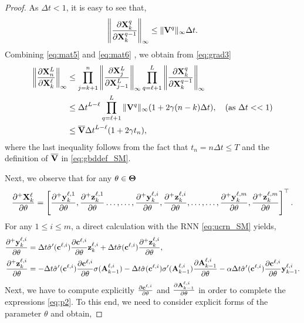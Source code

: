 \documentclass{article}
\newcommand{\by}{{\bf y}}
\newcommand{\bz}{{\bf z}}
\newcommand{\bV}{{\bf V}}
\newcommand{\bA}{{\bf A}}
\newcommand{\bX}{{\bf X}}
\newcommand{\bc}{{\bf c}}
\newcommand{\Dt}{{\Delta t}}
\begin{document}
\begin{proof}
As $\Dt <1$, it is easy to see that,
\begin{equation}
    \label{eq:mat6}
   \left \|\frac{\partial \bX^q_k}{\partial \bX^{q-1}_{k}}  \right \|_{\infty} \leq  \|\bV^q\|_{\infty} \Dt.
\end{equation}
Combining \eqref{eq:mat5} and \eqref{eq:mat6} , we obtain from \eqref{eq:grad3}
\begin{equation}
    \label{eq:mat7}
    \begin{aligned}
    \left \|\frac{\partial \bX^L_n}{\partial \bX^\ell_{k}}  \right \|_{\infty} &\leq \prod\limits_{j=k+1}^n  \left\|\frac{\partial \bX^L_j}{\partial \bX^L_{j-1}}\right \|_{\infty} \prod\limits_{q=\ell+1}^L  \left\|\frac{\partial \bX^q_k}{\partial \bX^{q-1}_{k}}\right\|_{\infty} \\ 
    &\leq \Dt^{L-\ell}\prod\limits_{q=\ell+1}^L \|\bV^q\|_{\infty} (1+2\gamma(n-k)\Dt), \quad ({\rm as}~\Dt <<1) \\
    &\leq \overline{\bV} \Dt^{L-\ell} (1+2\gamma t_n),
    \end{aligned}
\end{equation}
where the last inequality follows from the fact that $t_n = n \Dt \leq T$ and the definition of $\overline{\bV}$ in \eqref{eq:gbddef_SM}.

Next, we observe that for any $\theta \in {\bf \Theta}$
\begin{equation}
    \label{eq:p1}
    \frac{\partial^+\bX^\ell_k}{\partial \theta} = \left[
\frac{\partial^+\by^{\ell,1}_k}{\partial \theta},\frac{\partial^+\bz^{\ell,1}_k}{\partial \theta}\ldots,
\ldots,\frac{\partial^+\by^{\ell,i}_k}{\partial \theta},\frac{\partial^+\bz^{\ell,i}_k}{\partial \theta},\ldots,\ldots,\frac{\partial^+\by^{\ell,m}_k}{\partial \theta},\frac{\partial^+\bz^{\ell,m}_k}{\partial \theta}\right]^\top.
\end{equation}
For any $1 \leq i \leq m$, a direct calculation with the RNN \eqref{eq:ucrn_SM} yields,
\begin{equation}
    \label{eq:p2}
    \begin{aligned}
    \frac{\partial^+\by^{\ell,i}_k}{\partial \theta}&= \Dt \hat{\sigma}^{\prime}(\bc^{\ell,i})\frac{\partial \bc^{\ell,i}}{\partial \theta}\bz^{\ell,i}_k + \Dt \hat{\sigma}(\bc^{\ell,i})\frac{\partial^+\bz^{\ell,i}_k}{\partial \theta}, \\
    \frac{\partial^+\bz^{\ell,i}_k}{\partial \theta}&= -\Dt \hat{\sigma}^{\prime}(\bc^{\ell,i})\frac{\partial \bc^{\ell,i}}{\partial \theta}\sigma(\bA^{\ell,i}_{k-1}) -
    \Dt \hat{\sigma}(\bc^{\ell,i}) \sigma^{\prime}(\bA^{\ell,i}_{k-1})\frac{\partial \bA^{\ell,i}_{k-1}}{\partial \theta}-\alpha\Dt \hat{\sigma}^{\prime}(\bc^{\ell,i})\frac{\partial \bc^{\ell,i}}{\partial \theta}\by^{\ell,i}_{k-1}.
    \end{aligned}
\end{equation}
Next, we have to compute explicitly $\frac{\partial \bc^{\ell,i}}{\partial \theta}$ and $\frac{\partial \bA^{\ell,i}_{k-1}}{\partial \theta}$ in order to complete the expressions \eqref{eq:p2}. To this end, we need to consider explicit forms of the parameter $\theta$ and obtain, 


\end{proof}
\end{document}
